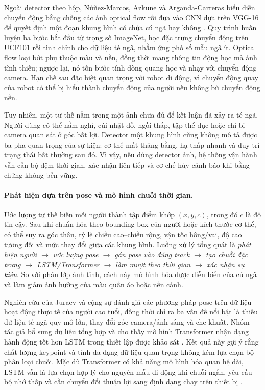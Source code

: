 Ngoài detector theo hộp, Núñez-Marcos, Azkune và Arganda-Carreras biểu diễn chuyển động bằng chồng các ảnh optical flow rồi đưa vào CNN dựa trên VGG-16 để quyết định một đoạn khung hình có chứa cú ngã hay không . Quy trình huấn luyện ba bước bắt đầu từ trọng số ImageNet, học đặc trưng chuyển động trên UCF101 rồi tinh chỉnh cho dữ liệu té ngã, nhằm ứng phó số mẫu ngã ít. Optical flow loại bớt phụ thuộc màu và nền, đồng thời mang thông tin động học mà ảnh tĩnh thiếu; ngược lại, nó tốn bước tính dòng quang học và nhạy với chuyển động camera. Hạn chế sau đặc biệt quan trọng với robot di động, vì chuyển động quay của robot có thể bị hiểu thành chuyển động của người nếu không bù chuyển động nền.

Tuy nhiên, một tư thế nằm trong một ảnh chưa đủ để kết luận đã xảy ra té ngã. Người dùng có thể nằm nghỉ, cúi nhặt đồ, ngồi thấp, tập thể dục hoặc chỉ bị camera quan sát ở góc bất lợi. Detector một khung hình cũng không mô tả được ba pha quan trọng của sự kiện: cơ thể mất thăng bằng, hạ thấp nhanh và duy trì trạng thái bất thường sau đó. Vì vậy, nếu dùng detector ảnh, hệ thống vận hành vẫn cần bộ đệm thời gian, xác nhận liên tiếp và cơ chế hủy cảnh báo khi bằng chứng không bền vững.

\paragraph{Phát hiện dựa trên pose và mô hình chuỗi thời gian.}
Ước lượng tư thế biến mỗi người thành tập điểm khớp $(x,y,c)$, trong đó $c$ là độ tin cậy. Sau khi chuẩn hóa theo bounding box của người hoặc kích thước cơ thể, có thể suy ra góc thân, tỷ lệ chiều cao--chiều rộng, vận tốc hông/vai, độ cao tương đối và mức thay đổi giữa các khung hình. Luồng xử lý tổng quát là \textit{phát hiện người $\rightarrow$ ước lượng pose $\rightarrow$ gán pose vào đúng track $\rightarrow$ tạo chuỗi đặc trưng $\rightarrow$ LSTM/Transformer $\rightarrow$ làm mượt theo thời gian $\rightarrow$ xác nhận sự kiện}. So với phân lớp ảnh tĩnh, cách này mô hình hóa được diễn biến của cú ngã và làm giảm ảnh hưởng của màu quần áo hoặc nền cảnh.

Nghiên cứu của Juraev và cộng sự đánh giá các phương pháp pose trên dữ liệu hoạt động thực tế của người cao tuổi, đồng thời chỉ ra ba vấn đề nổi bật là thiếu dữ liệu té ngã quy mô lớn, thay đổi góc camera/ánh sáng và che khuất. Nhóm tác giả bổ sung dữ liệu tổng hợp và cho thấy mô hình Transformer nhận dạng hành động tốt hơn LSTM trong thiết lập được khảo sát . Kết quả này gợi ý rằng chất lượng keypoint và tính đa dạng dữ liệu quan trọng không kém lựa chọn bộ phân loại chuỗi. Mặc dù Transformer có khả năng mô hình hóa quan hệ dài, LSTM vẫn là lựa chọn hợp lý cho nguyên mẫu di động khi chuỗi ngắn, yêu cầu bộ nhớ thấp và cần chuyển đổi thuận lợi sang định dạng chạy trên thiết bị .

